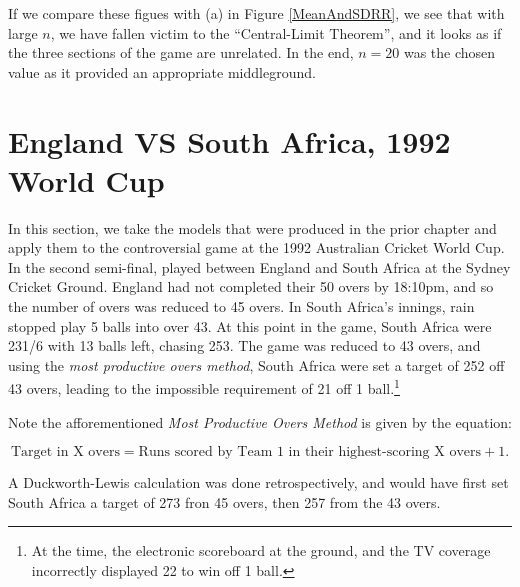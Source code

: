 If we compare these figues with (a) in Figure \ref{MeanAndSDRR}, we see that with large $n$, we have fallen victim to the ``Central-Limit Theorem'', and it looks as if the three 
sections of the game are unrelated. In the end, $n=20$ was the chosen value as it provided an appropriate middleground. 

\section{England VS South Africa, 1992 World Cup}
In this section, we take the models that were produced in the prior chapter and apply them to the controversial game at the 1992 Australian Cricket World Cup. In the second semi-final,
played between England and South Africa at the Sydney Cricket Ground. England had not completed their 50 overs by 18:10pm, and so the number of overs was reduced to 45 overs. In South Africa's
innings, rain stopped play 5 balls into over 43. At this point in the game, South Africa were 231/6 with 13 balls left, chasing 253. The game was reduced to 43 overs, and using the \textit{most 
productive overs method}, South Africa were set a target of 252 off 43 overs, leading to the impossible requirement of 21 off 1 ball.\footnote{At the time, the electronic scoreboard at the ground,
and the TV coverage incorrectly displayed 22 to win off 1 ball.}

Note the afforementioned \textit{Most Productive Overs Method} is given by the equation:

\begin{equation}
    \text{Target in X overs} = \text{Runs scored by Team 1 in their highest-scoring X overs} + 1.
\end{equation}

A Duckworth-Lewis calculation was done retrospectively, and would have first set South Africa a target of 273 fron 45 overs, then 257 from the 43 overs.


